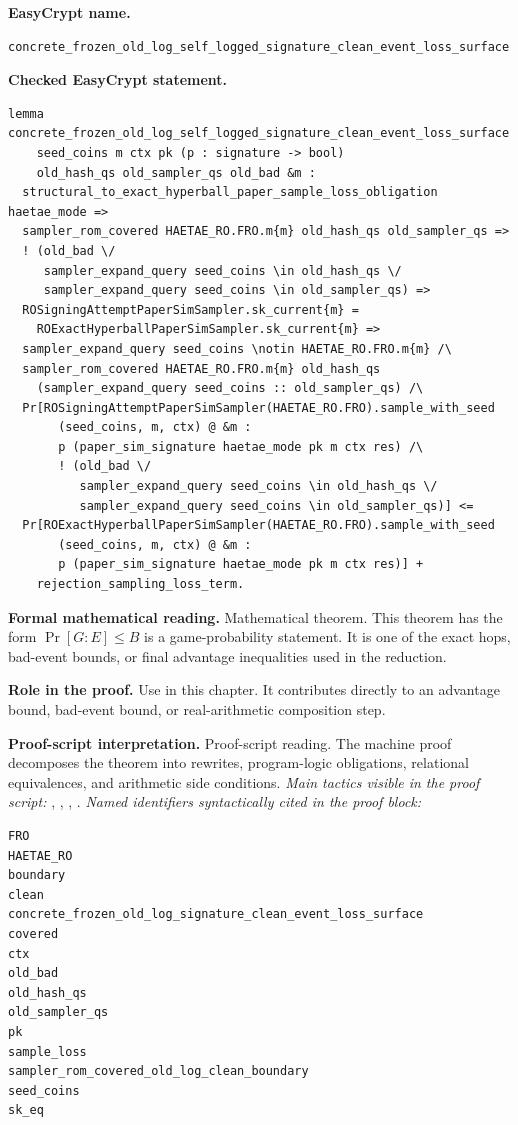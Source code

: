 \begin{formaltheorem}
\noindent\textbf{EasyCrypt name.}
\begin{lstlisting}[language=EasyCrypt,basicstyle=\ttfamily\scriptsize]
concrete_frozen_old_log_self_logged_signature_clean_event_loss_surface
\end{lstlisting}
\noindent\textbf{Checked EasyCrypt statement.}
\begin{lstlisting}[language=EasyCrypt,basicstyle=\ttfamily\scriptsize]
lemma concrete_frozen_old_log_self_logged_signature_clean_event_loss_surface
    seed_coins m ctx pk (p : signature -> bool)
    old_hash_qs old_sampler_qs old_bad &m :
  structural_to_exact_hyperball_paper_sample_loss_obligation haetae_mode =>
  sampler_rom_covered HAETAE_RO.FRO.m{m} old_hash_qs old_sampler_qs =>
  ! (old_bad \/
     sampler_expand_query seed_coins \in old_hash_qs \/
     sampler_expand_query seed_coins \in old_sampler_qs) =>
  ROSigningAttemptPaperSimSampler.sk_current{m} =
    ROExactHyperballPaperSimSampler.sk_current{m} =>
  sampler_expand_query seed_coins \notin HAETAE_RO.FRO.m{m} /\
  sampler_rom_covered HAETAE_RO.FRO.m{m} old_hash_qs
    (sampler_expand_query seed_coins :: old_sampler_qs) /\
  Pr[ROSigningAttemptPaperSimSampler(HAETAE_RO.FRO).sample_with_seed
       (seed_coins, m, ctx) @ &m :
       p (paper_sim_signature haetae_mode pk m ctx res) /\
       ! (old_bad \/
          sampler_expand_query seed_coins \in old_hash_qs \/
          sampler_expand_query seed_coins \in old_sampler_qs)] <=
  Pr[ROExactHyperballPaperSimSampler(HAETAE_RO.FRO).sample_with_seed
       (seed_coins, m, ctx) @ &m :
       p (paper_sim_signature haetae_mode pk m ctx res)] +
    rejection_sampling_loss_term.
\end{lstlisting}
\noindent\textbf{Formal mathematical reading.}
Mathematical theorem. This theorem has the form \(\Pr[G:E] \le B\) is a game-probability statement.  It is one of the exact hops, bad-event bounds, or final advantage inequalities used in the reduction.

\noindent\textbf{Role in the proof.}
Use in this chapter. It contributes directly to an advantage bound, bad-event bound, or real-arithmetic composition step.

\noindent\textbf{Proof-script interpretation.}
Proof-script reading. The machine proof decomposes the theorem into rewrites, program-logic obligations, relational equivalences, and arithmetic side conditions.
\emph{Main tactics visible in the proof script:} , , , .
\emph{Named identifiers syntactically cited in the proof block:}
\begin{lstlisting}[language=EasyCrypt,basicstyle=\ttfamily\scriptsize]
FRO
HAETAE_RO
boundary
clean
concrete_frozen_old_log_signature_clean_event_loss_surface
covered
ctx
old_bad
old_hash_qs
old_sampler_qs
pk
sample_loss
sampler_rom_covered_old_log_clean_boundary
seed_coins
sk_eq
\end{lstlisting}

\end{formaltheorem}

